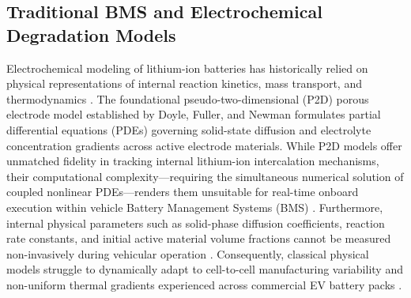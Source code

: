 \documentclass[pdflatex,sn-mathphys-num]{sn-jnl}%
\theoremstyle{thmstyleone}%
\theoremstyle{thmstyletwo}%
\theoremstyle{thmstylethree}%
\begin{document}
\subsection{Traditional BMS and Electrochemical Degradation Models}\label{subsec:traditional_bms}
Electrochemical modeling of lithium-ion batteries has historically relied on physical representations of internal reaction kinetics, mass transport, and thermodynamics \cite{plett2004extended,hu2012comparative,doyle1993modeling}. The foundational pseudo-two-dimensional (P2D) porous electrode model established by Doyle, Fuller, and Newman \cite{doyle1993modeling} formulates partial differential equations (PDEs) governing solid-state diffusion and electrolyte concentration gradients across active electrode materials. While P2D models offer unmatched fidelity in tracking internal lithium-ion intercalation mechanisms, their computational complexity---requiring the simultaneous numerical solution of coupled nonlinear PDEs---renders them unsuitable for real-time onboard execution within vehicle Battery Management Systems (BMS) \cite{santhanagopalan2006online,vetter2005ageing}. Furthermore, internal physical parameters such as solid-phase diffusion coefficients, reaction rate constants, and initial active material volume fractions cannot be measured non-invasively during vehicular operation \cite{lucu2018critical}. Consequently, classical physical models struggle to dynamically adapt to cell-to-cell manufacturing variability and non-uniform thermal gradients experienced across commercial EV battery packs \cite{li2019datadriven}.
\end{document}
